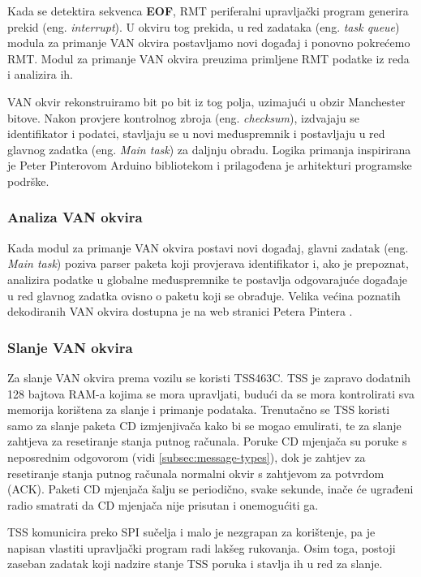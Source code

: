\noindent
Kada se detektira sekvenca \textbf{EOF}, RMT periferalni upravljački program generira prekid (eng. \textit{interrupt}). 
U okviru tog prekida, u red zadataka (eng. \textit{task queue}) modula za primanje VAN okvira postavljamo novi događaj i ponovno pokrećemo RMT. 
Modul za primanje VAN okvira preuzima primljene RMT podatke iz reda i analizira ih. 

VAN okvir rekonstruiramo bit po bit iz tog polja, uzimajući u obzir Manchester bitove. 
Nakon provjere kontrolnog zbroja (eng. \textit{checksum}), izdvajaju se identifikator i podatci, 
stavljaju se u novi međuspremnik i postavljaju u red glavnog zadatka (eng. \textit{Main task}) za daljnju obradu. 
Logika primanja inspirirana je Peter Pinterovom Arduino bibliotekom \cite{esp32_rmt_van} i prilagođena je arhitekturi programske podrške.

\subsubsection{Analiza VAN okvira}

Kada modul za primanje VAN okvira postavi novi događaj, glavni zadatak (eng. \textit{Main task}) 
poziva parser paketa koji provjerava identifikator i, ako je prepoznat, analizira podatke u globalne međuspremnike 
te postavlja odgovarajuće događaje u red glavnog zadatka ovisno o paketu koji se obrađuje. 
Velika većina poznatih dekodiranih VAN okvira dostupna je na web stranici Petera Pintera \cite{vanbus_packets}.

\subsubsection{Slanje VAN okvira}

Za slanje VAN okvira prema vozilu se koristi TSS463C. 
TSS je zapravo dodatnih 128 bajtova RAM-a kojima se mora upravljati, budući da se mora kontrolirati sva memorija korištena za slanje i primanje podataka.
Trenutačno se TSS koristi samo za slanje paketa CD izmjenjivača kako bi se mogao emulirati, te za slanje zahtjeva za resetiranje stanja putnog računala. 
Poruke CD mjenjača su poruke s neposrednim odgovorom (vidi \ref{subsec:message-types}), dok je zahtjev za resetiranje stanja putnog računala normalni okvir s zahtjevom za potvrdom (ACK). 
Paketi CD mjenjača šalju se periodično, svake sekunde, inače će ugrađeni radio smatrati da CD mjenjača nije prisutan i onemogućiti ga.

\noindent
TSS komunicira preko SPI sučelja i malo je nezgrapan za korištenje, pa je napisan vlastiti upravljački program radi lakšeg rukovanja. 
Osim toga, postoji zaseban zadatak koji nadzire stanje TSS poruka i stavlja ih u red za slanje.

